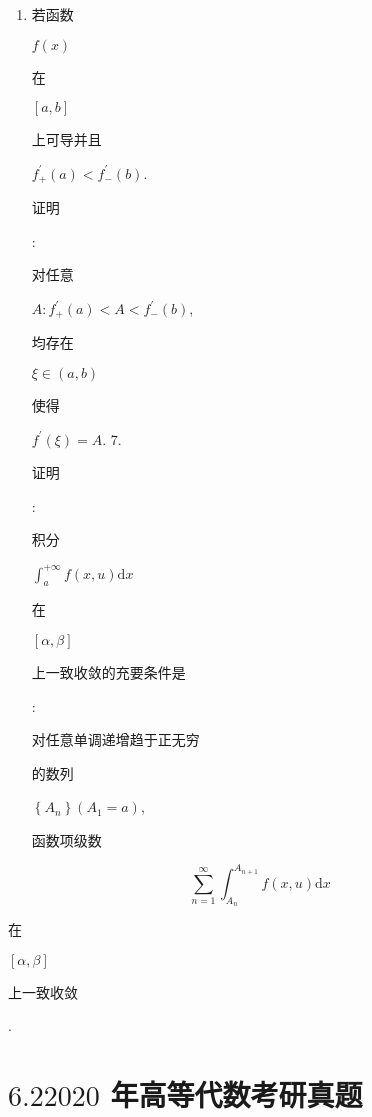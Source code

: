 \documentclass[10pt]{article}
\begin{document}
\begin{enumerate}
  \item \begin{CJK}{UTF8}{mj}若函数\end{CJK} $f(x)$ \begin{CJK}{UTF8}{mj}在\end{CJK} $[a, b]$ \begin{CJK}{UTF8}{mj}上可导并且\end{CJK} $f_{+}^{\prime}(a)<f_{-}^{\prime}(b)$. \begin{CJK}{UTF8}{mj}证明\end{CJK}: \begin{CJK}{UTF8}{mj}对任意\end{CJK} $A: f_{+}^{\prime}(a)<A<f_{-}^{\prime}(b)$, \begin{CJK}{UTF8}{mj}均存在\end{CJK} $\xi \in(a, b)$ \begin{CJK}{UTF8}{mj}使得\end{CJK} $f^{\prime}(\xi)=A$. 7. \begin{CJK}{UTF8}{mj}证明\end{CJK}: \begin{CJK}{UTF8}{mj}积分\end{CJK} $\int_{a}^{+\infty} f(x, u) \mathrm{d} x$ \begin{CJK}{UTF8}{mj}在\end{CJK} $[\alpha, \beta]$ \begin{CJK}{UTF8}{mj}上一致收敛的充要条件是\end{CJK}: \begin{CJK}{UTF8}{mj}对任意单调递增趋于正无穷\end{CJK} \begin{CJK}{UTF8}{mj}的数列\end{CJK} $\left\{A_{n}\right\}\left(A_{1}=a\right)$, \begin{CJK}{UTF8}{mj}函数项级数\end{CJK}

\end{enumerate}
$$
\sum_{n=1}^{\infty} \int_{A_{n}}^{A_{n+1}} f(x, u) \mathrm{d} x
$$
\begin{CJK}{UTF8}{mj}在\end{CJK} $[\alpha, \beta]$ \begin{CJK}{UTF8}{mj}上一致收敛\end{CJK}.

\section{$6.22020$ 年高等代数考研真题}
\end{document}
